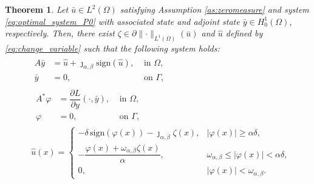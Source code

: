\documentclass[11pt,a4paper]{amsart}
\newcommand{\ds}{\displaystyle}
\newcommand{\om}{\Omega}
\newcommand{\ga}{\Gamma}
\newcommand{\sign}{\mathrm{sign}}
\newtheorem{theorem}{{Theorem}}
\newcommand{\norm}[1]{\lVert #1 \rVert}
\begin{document}
\begin{theorem} Let $\bar u \in L^2(\om)$ satisfying Assumption \ref{as:zeromeasure} and system \eqref{eq:optimal_system_P0} with associated state and adjoint state $\bar y\in H_0^1(\om)$, respectively. Then, there exist $\zeta \in \partial \norm{\cdot}_{L^1(\om)}(\bar u)$ and $\hat u$ defined by \eqref{eq:change_variable} such that the following system holds:
\begin{subequations}\label{eq:optimal_system_changed_variable}
	\begin{align}
&\begin{array}{rlc}
	A\bar y & = \hat u + \jmath_{\alpha,\beta}\sign(\hat u), & \text{ in } \om, \\
      \bar y &= 0, & \text{ on } \ga, 
\end{array}\label{eq:optimal_system_P0_a}\\
%
&\,\begin{array}{rlc}
	A^*\varphi & = \dfrac{\partial L}{\partial y}(\cdot,\bar y),& \text{ in } \om, \\
      \varphi &= 0, & \text{ on } \ga ,
\end{array} \label{eq:optimal_system_P0_b}\\
&\hat u(x)=\ds
\begin{cases} 
-\delta\,\sign(\varphi(x))-\jmath_{\alpha,\beta}\zeta(x), &|\varphi(x)|\ge \alpha \delta,\\
-\dfrac{\varphi(x)+\omega_{\alpha,\beta}\zeta(x)}{\alpha},&\omega_{\alpha,\beta}\le |\varphi(x)|<\alpha\delta,\\
0, &|\varphi(x)|<\omega_{\alpha,\beta}.
\end{cases}
\label{eq:optimal_system_P_d}
\end{align}
\end{subequations}	
\end{theorem}
\end{document}
